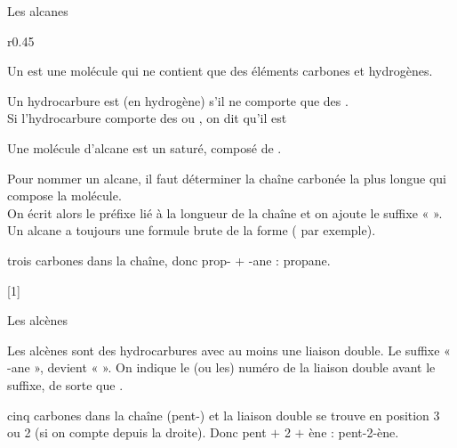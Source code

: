 \begin{doc}{Les alcanes}
  \begin{wrapfigure}{r}{0.45\linewidth}   
    \vspace*{-30pt}
    \begin{boite}
      \begin{importants}
        Un  est une molécule qui ne contient que des éléments carbones et hydrogènes.
      \end{importants}
      \begin{importants}
        Un hydrocarbure est  (en hydrogène) s'il ne comporte que des . \\
        Si l'hydrocarbure comporte des  ou , on dit qu'il est 
      \end{importants}
    \end{boite}
  \end{wrapfigure}
  \phantom{b}\vspace*{-14pt}
  
  \begin{importants}
    Une molécule d'alcane est un  saturé, composé de .
  \end{importants}
  Pour nommer un alcane, il faut déterminer la chaîne carbonée la plus longue qui compose la molécule. \\
  On écrit alors le préfixe lié à la longueur de la chaîne et on ajoute le suffixe «  ». \\
  Un alcane a toujours une formule brute de la forme  ( par exemple).
  
  \vspace*{4pt}
  \exemple {} trois carbones dans la chaîne, donc prop- + -ane : propane.
\end{doc}

[1]


\begin{doc}{Les alcènes}
  \begin{importants}
    Les alcènes sont des hydrocarbures avec au moins une liaison double.
    Le suffixe « -ane », devient «  ».
    On indique le (ou les) numéro de la liaison double avant le suffixe, de sorte que .
  \end{importants}
  \exemple {} cinq carbones dans la chaîne (pent-) et la liaison double se trouve en position 3 ou 2 (si on compte depuis la droite).
  Donc pent $+$ 2 $+$ ène : pent-2-ène.
\end{doc}


